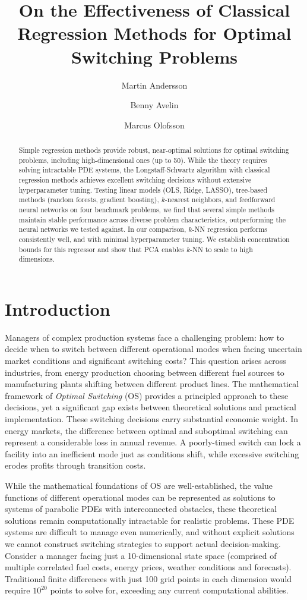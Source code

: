 \documentclass[11pt,reqno,a4paper]{amsart}
\title{On the Effectiveness of Classical Regression Methods for Optimal Switching Problems}
\author[Andersson]{Martin Andersson}
\author[Avelin]{Benny Avelin}
\author[Olofsson]{Marcus Olofsson}
\theoremstyle{definition}
\numberwithin{equation}{section}
\DeclareMathOperator{\1}{\mathbbm{1}}
\begin{document}
\begin{abstract}
  Simple regression methods provide robust, near-optimal solutions for optimal switching problems, including high-dimensional ones (up to 50). While the theory requires solving intractable PDE systems, the Longstaff-Schwartz algorithm with classical regression methods achieves excellent switching decisions without extensive hyperparameter tuning. Testing linear models (OLS, Ridge, LASSO), tree-based methods (random forests, gradient boosting), $k$-nearest neighbors, and feedforward neural networks on four benchmark problems, we find that several simple methods maintain stable performance across diverse problem characteristics, outperforming the neural networks we tested against. In our comparison, $k$-NN regression performs consistently well, and with minimal hyperparameter tuning. We establish concentration bounds for this regressor and show that PCA enables $k$-NN to scale to high dimensions.
\end{abstract}

\maketitle

\setcounter{tocdepth}{1}
\tableofcontents

\section{Introduction}
Managers of complex production systems face a challenging problem: how to decide when to switch between different operational modes when facing uncertain market conditions and significant switching costs? This question arises across industries, from energy production choosing between different fuel sources to manufacturing plants shifting between different product lines. The mathematical framework of \emph{Optimal Switching} (OS) provides a principled approach to  these decisions, yet a significant gap exists between theoretical solutions and practical implementation. These switching decisions carry substantial economic weight. In energy markets, the difference between optimal and suboptimal switching can represent a considerable loss in annual revenue. A poorly-timed switch can lock a facility into an inefficient mode just as conditions shift, while excessive switching erodes profits through transition costs.

While the mathematical foundations of OS are well-established, the value functions of different operational modes can be represented as solutions to systems of parabolic PDEs with interconnected obstacles, these theoretical solutions remain computationally intractable for realistic problems. These PDE systems are difficult to manage even numerically, and without explicit solutions we cannot construct switching strategies to support actual decision-making. Consider a manager facing just a 10-dimensional state space (comprised of multiple correlated fuel costs, energy prices, weather conditions and forecasts). Traditional finite differences with just 100 grid points in each dimension would require $10^{20}$ points to solve for, exceeding any current computational abilities.
\end{document}

